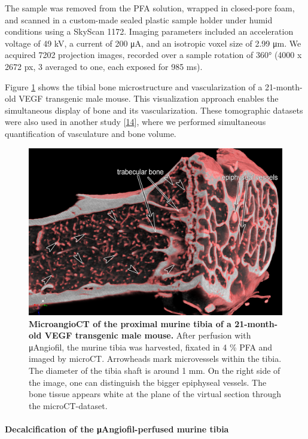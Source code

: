 The sample was removed from the PFA solution, wrapped in closed-pore foam, and scanned in a custom-made sealed plastic sample holder under humid conditions using a SkyScan 1172.
Imaging parameters included an acceleration voltage of 49 kV, a current of 200 μA, and an isotropic voxel size of 2.99 μm.
We acquired 7202 projection images, recorded over a sample rotation of 360° (4000 x 2672 px, 3 averaged to one, each exposed for 985 ms).

Figure \ref{fig:1} shows the tibial bone microstructure and vascularization of a 21-month-old VEGF transgenic male mouse.
This visualization approach enables the simultaneous display of bone and its vascularization.
These tomographic datasets were also used in another study {[}\protect\hyperlink{ref-nC0ZZVgL}{14}{]}, where we performed simultaneous quantification of vasculature and bone volume.

\begin{figure}
\hypertarget{fig:1}{%
\centering
\includegraphics{images/Fig1_murine_tibia.png}
\caption{\textbf{MicroangioCT of the proximal murine tibia of a 21-month-old VEGF transgenic male mouse.}
After perfusion with μAngiofil, the murine tibia was harvested, fixated in 4 \% PFA and imaged by microCT.
Arrowheads mark microvessels within the tibia.
The diameter of the tibia shaft is around 1 mm.
On the right side of the image, one can distinguish the bigger epiphyseal vessels.
The bone tissue appears white at the plane of the virtual section through the microCT-dataset.}\label{fig:1}
}
\end{figure}

\hypertarget{decalcification-of-the-ux3bcangiofil-perfused-murine-tibia}{%
\paragraph{Decalcification of the μAngiofil-perfused murine tibia}\label{decalcification-of-the-ux3bcangiofil-perfused-murine-tibia}}

